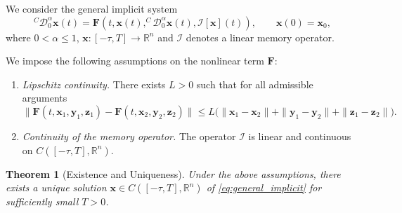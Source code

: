 \documentclass[12pt,a4paper]{article}
\newtheorem{theorem}{Theorem}[section]
\numberwithin{equation}{section}
\begin{document}
	We consider the general implicit system
	\begin{equation}
		^{C}\mathcal{D}_{0}^{\alpha} \mathbf{x}(t) = \mathbf{F}\!\left( t,\mathbf{x}(t), ^{C}\mathcal{D}_{0}^{\alpha} \mathbf{x}(t), \mathcal{I}[\mathbf{x}](t) \right), \qquad \mathbf{x}(0)=\mathbf{x}_0,
		\label{eq:general_implicit}
	\end{equation}
	where $0<\alpha\le1$, $\mathbf{x}:[-\tau,T]\to\mathbb{R}^n$ and $\mathcal{I}$ denotes a linear memory operator.
	
	We impose the following assumptions on the nonlinear term $\mathbf{F}$:
	\begin{enumerate}
		\item \emph{Lipschitz continuity.} There exists $L>0$ such that for all admissible arguments
		\begin{equation}
			\|\mathbf{F}(t,\mathbf{x}_1,\mathbf{y}_1,\mathbf{z}_1) - \mathbf{F}(t,\mathbf{x}_2,\mathbf{y}_2,\mathbf{z}_2)\| \le L\big( \|\mathbf{x}_1-\mathbf{x}_2\| + \|\mathbf{y}_1-\mathbf{y}_2\| + \|\mathbf{z}_1-\mathbf{z}_2\| \big).
			\label{eq:lipschitz_condition}
		\end{equation}
		
		\item \emph{Continuity of the memory operator.} The operator $\mathcal{I}$ is linear and continuous on $C([-\tau,T],\mathbb{R}^n)$.
	\end{enumerate}
	
	\begin{theorem}[Existence and Uniqueness]
		\label{thm:existence}
		Under the above assumptions, there exists a unique solution $\mathbf{x}\in C([-\tau,T],\mathbb{R}^n)$ of \eqref{eq:general_implicit} for sufficiently small $T>0$.
	\end{theorem}
	
\end{document}
